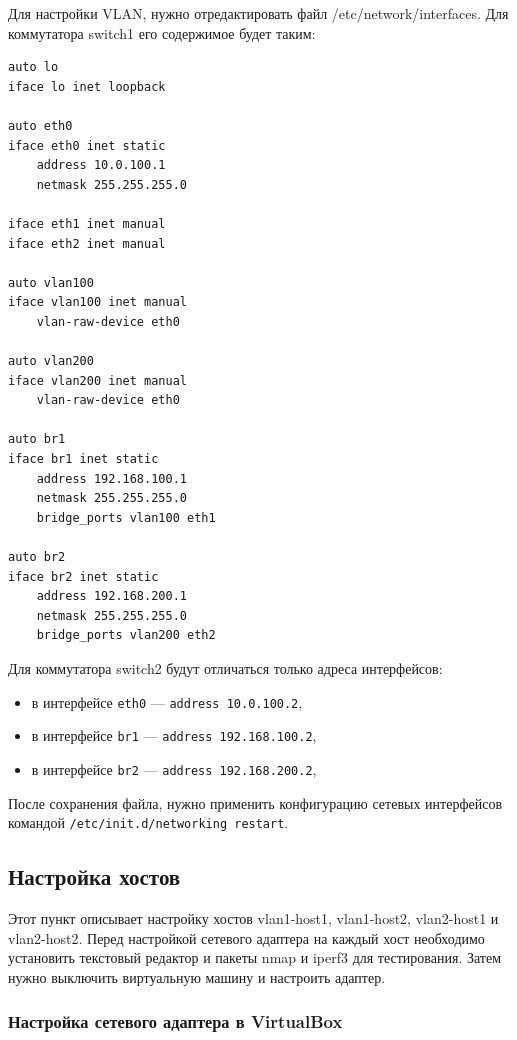 \documentclass{article}
\begin{document}
Для настройки VLAN, нужно отредактировать файл /etc/network/interfaces. Для коммутатора switch1 его содержимое будет таким:
\begin{lstlisting}
auto lo
iface lo inet loopback

auto eth0
iface eth0 inet static
    address 10.0.100.1
    netmask 255.255.255.0
    
iface eth1 inet manual
iface eth2 inet manual

auto vlan100
iface vlan100 inet manual
    vlan-raw-device eth0
    
auto vlan200
iface vlan200 inet manual
    vlan-raw-device eth0

auto br1
iface br1 inet static
    address 192.168.100.1
    netmask 255.255.255.0
    bridge_ports vlan100 eth1
    
auto br2
iface br2 inet static
    address 192.168.200.1
    netmask 255.255.255.0
    bridge_ports vlan200 eth2
\end{lstlisting}
Для коммутатора switch2 будут отличаться только адреса интерфейсов:
\begin{itemize}
    \itemsep0em 
    \item в интерфейсе \verb|eth0| --- \verb|address 10.0.100.2|,
    \item в интерфейсе \verb|br1| --- \verb|address 192.168.100.2|,
    \item в интерфейсе \verb|br2| --- \verb|address 192.168.200.2|,
\end{itemize}
После сохранения файла, нужно применить конфигурацию сетевых интерфейсов командой \verb|/etc/init.d/networking restart|.

\subsection{Настройка хостов}
Этот пункт описывает настройку хостов vlan1-host1, vlan1-host2, vlan2-host1 и vlan2-host2. Перед настройкой сетевого адаптера на каждый хост необходимо установить текстовый редактор и пакеты nmap и iperf3 для тестирования. Затем нужно выключить виртуальную машину и настроить адаптер.

\subsubsection{Настройка сетевого адаптера в VirtualBox}
\end{document}
